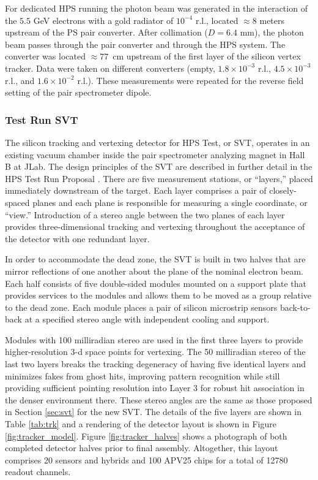For dedicated HPS running the photon beam was generated in the interaction of the $5.5$ GeV electrons with a gold radiator of $10^{-4}$ r.l., located $\approx 8$ meters upstream of the PS pair converter. After collimation ($D=6.4$ mm), the photon beam passes through the pair converter and through the HPS system. The converter was located $\approx 77$~cm upstream of the first layer of the silicon vertex tracker. Data were taken on different converters (empty, $1.8\times 10^{-3}$ r.l., $4.5\times 10^{-3}$ r.l., and $1.6\times 10^{-2}$ r.l.). These measurements were repeated for the reverse field setting of the pair spectrometer dipole.

\subsubsection{Test Run SVT}

The silicon tracking and vertexing detector for HPS Test, or SVT, operates in an existing vacuum chamber inside the pair spectrometer analyzing magnet in Hall B at JLab.  The design principles of the SVT are described in further detail in the HPS Test Run Proposal  \cite{HPS_tPROP}. There are five measurement stations, or ``layers,'' placed immediately downstream of the target. Each layer comprises a pair of closely-spaced planes and each plane is responsible for measuring a single coordinate, or ``view.'' Introduction of a stereo angle between the two planes of each layer provides three-dimensional tracking and vertexing throughout the acceptance of the detector with one redundant layer. 

In order to accommodate the dead zone, the SVT is built in two halves that are mirror reflections of one another about the plane of the nominal electron beam.  Each half consists of five double-sided modules mounted on a support plate that provides services to the modules and allows them to be moved as a group relative to the dead zone. Each module places a pair of silicon microstrip sensors back-to-back at a specified stereo angle with independent cooling and support.

Modules with 100 milliradian stereo are used in the first three layers to provide higher-resolution 3-d space points for vertexing. The 50 milliradian stereo of the last two layers breaks the tracking degeneracy of having five identical layers and minimizes fakes from ghost hits, improving pattern recognition while still providing sufficient pointing resolution into Layer 3 for robust hit association in the denser environment there. These stereo angles are the same as those proposed in Section \ref{sec:svt} for the new SVT. The details of the five layers are shown in Table \ref{tab:trk} and a rendering of the detector layout is shown in Figure \ref{fig:tracker_model}.  Figure \ref{fig:tracker_halves} shows a photograph of both completed detector halves prior to final assembly.  Altogether, this layout comprises 20 sensors and hybrids and 100 APV25 chips for a total of 12780 readout channels. 


